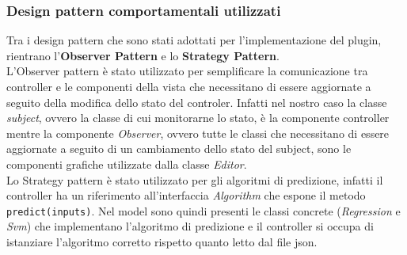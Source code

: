 \subsubsection{Design pattern comportamentali utilizzati}
Tra i design pattern che sono stati adottati per l'implementazione del plugin, rientrano l'\textbf{Observer Pattern} e lo \textbf{Strategy Pattern}. \\
L'Observer pattern è stato utilizzato per semplificare la comunicazione tra controller e le componenti della vista che necessitano di essere aggiornate a seguito della modifica dello stato del controler. Infatti nel nostro caso la classe \textit{subject}, ovvero la classe di cui monitorarne lo stato, è la componente controller mentre la componente \textit{Observer}, ovvero tutte le classi che necessitano di essere aggiornate a seguito di un cambiamento dello stato del subject, sono le componenti grafiche utilizzate dalla classe \textit{Editor}. \\
Lo Strategy pattern è stato utilizzato per gli algoritmi di predizione, infatti il controller ha un riferimento all'interfaccia \textit{Algorithm} che espone il metodo \texttt{predict(inputs)}. Nel model sono quindi presenti le classi concrete (\textit{Regression} e \textit{Svm}) che implementano l'algoritmo di predizione e il controller si occupa di istanziare l'algoritmo corretto rispetto quanto letto dal file json.